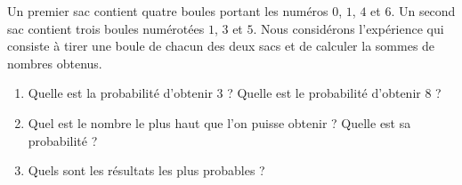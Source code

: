 
\begin{exercice}\label{exosmath-0282}

    Un premier sac contient quatre boules portant les numéros \( 0\), \( 1\), \( 4\) et \( 6\). Un second sac contient trois boules numérotées \( 1\), \( 3\) et \( 5\). Nous considérons l'expérience qui consiste à tirer une boule de chacun des deux sacs et de calculer la sommes de nombres obtenus.
    \begin{enumerate}
        \item
            Quelle est la probabilité d'obtenir \( 3\) ? Quelle est le probabilité d'obtenir \( 8\) ?
        \item
            Quel est le nombre le plus haut que l'on puisse obtenir ? Quelle est sa probabilité ?
        \item
            Quels sont les résultats les plus probables ?
    \end{enumerate}

\end{exercice}
